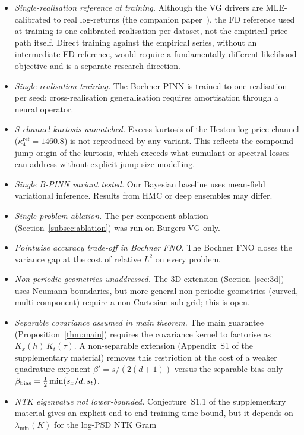 \documentclass[review,12pt]{elsarticle}
\begin{document}
\begin{itemize}
\item \emph{Single-realisation reference at training.} Although the
VG drivers are MLE-calibrated to real log-returns
(the companion paper~\citep{Lipski2026RealWorld}), the FD reference used at training is
one calibrated realisation per dataset, not the empirical price path
itself. Direct training against the empirical series, without an
intermediate FD reference, would require a fundamentally different
likelihood objective and is a separate research direction.
\item \emph{Single-realisation training.} The Bochner PINN is
trained to one realisation per seed; cross-realisation
generalisation requires amortisation through a neural operator.
\item \emph{S-channel kurtosis unmatched.} Excess kurtosis of
the Heston log-price channel (\(\kappa_4^{\mathrm{ref}} = 1460.8\))
is not reproduced by any variant. This reflects the compound-jump
origin of the kurtosis, which exceeds what cumulant or spectral
losses can address without explicit jump-size modelling.
\item \emph{Single B-PINN variant tested.} Our Bayesian baseline
uses mean-field variational inference. Results from HMC or deep
ensembles may differ.
\item \emph{Single-problem ablation.} The per-component ablation
(Section~\ref{subsec:ablation}) was run on Burgers-VG only.
\item \emph{Pointwise accuracy trade-off in Bochner FNO.} The
Bochner FNO closes the variance gap at the cost of relative
$L^2$ on every problem.
\item \emph{Non-periodic geometries unaddressed.} The 3D extension
(Section~\ref{sec:3d}) uses Neumann boundaries, but more general
non-periodic geometries (curved, multi-component) require a
non-Cartesian sub-grid; this is open.
\item \emph{Separable covariance assumed in main theorem.} The main
guarantee (Proposition~\ref{thm:main}) requires the covariance kernel
to factorise as $K_x(h)\,K_t(\tau)$. A non-separable extension
(Appendix~S1 of the supplementary material)
removes this restriction at the cost of a weaker quadrature exponent
$\beta'=s/(2(d+1))$ versus the separable bias-only
$\beta_{\rm bias}=\tfrac{1}{2}\min(s_x/d,s_t)$.
\item \emph{NTK eigenvalue not lower-bounded.}
Conjecture~S1.1 of the supplementary material gives an explicit end-to-end training-time
bound, but it depends on $\lambda_{\min}(K)$ for the log-PSD NTK Gram

\end{itemize}
\end{document}
